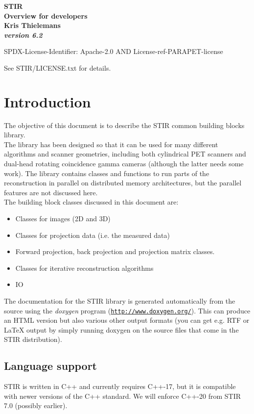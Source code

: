\documentclass{article}
\def\R2Lurl#1#2{\mbox{\href{#1}{\tt #2}}}
\begin{document}
\begin{center}
\textbf{{\huge STIR \\
Overview for developers}}\\
\textbf{Kris Thielemans}\\
\textbf{\textit{version 6.2}}

\end{center}

SPDX-License-Identifier: Apache-2.0 AND License-ref-PARAPET-license

See STIR/LICENSE.txt for details.

\tableofcontents


\section{
Introduction}

The objective of this document is to describe the STIR common 
building blocks library.\\
The library has been designed so that it can be used for many 
different algorithms and scanner geometries, including both cylindrical 
PET scanners and dual-head rotating coincidence gamma cameras 
(although the latter needs some work). The library contains classes 
and functions to run parts of the reconstruction in parallel 
on distributed memory architectures, but the parallel features 
are not discussed here.\\
The building block classes discussed in this document are:
\begin{itemize}
\item
Classes for images (2D and 3D)
\item 
Classes for projection data (i.e. the measured data)
\item 
Forward projection, back projection and projection matrix classes.
\item 
Classes for iterative reconstruction algorithms
\item IO
\end{itemize}

The documentation
for the STIR library is generated automatically from the source 
using the \textit{doxygen} program (\R2Lurl{http://www.doxygen.org/ }{http://www.doxygen.org/}). 
This can produce an HTML version but also various other output 
formats (you can get e.g. RTF or LaTeX output by simply running 
doxygen on the source files that come in the STIR distribution). 

\subsection{Language support}
STIR is written in C++ and currently requires C++-17, but it is compatible with newer versions of the C++ standard.
We will enforce C++-20 from STIR 7.0 (possibly earlier).
\end{document}
